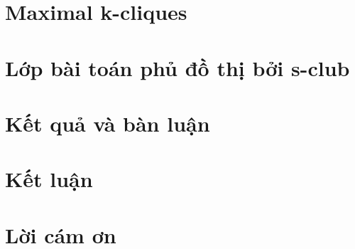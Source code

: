 \documentclass[red]{TBUJournal}
\begin{document}
\section{Maximal k-cliques}
\label{sec:introduction}


\section{Lớp bài toán phủ đồ thị bởi s-club}
\label{sec:proposedAlgorithm}


\section{Kết quả và bàn luận}
\label{sec:results}
%


\section{Kết luận}
\label{sec:conclusion}
%
%

\section*{Lời cám ơn} 
\label{Acknowledgment}
%	

%	



\setlength{\bibsep}{3pt}
\fontsize{11}{11}\selectfont


\end{document}
